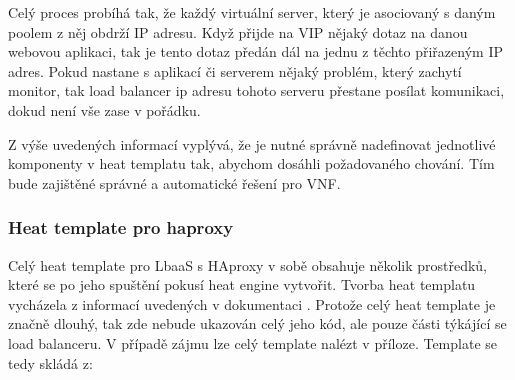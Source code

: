 Celý proces probíhá tak, že každý virtuální server, který je asociovaný s daným poolem z něj obdrží IP adresu. Když přijde na VIP nějaký dotaz na danou webovou aplikaci, tak je tento dotaz předán dál na jednu z těchto přiřazeným IP adres. Pokud nastane s aplikací či serverem nějaký problém, který zachytí monitor, tak load balancer ip adresu tohoto serveru přestane posílat komunikaci, dokud není vše zase v pořádku. 

Z výše uvedených informací vyplývá, že je nutné správně nadefinovat jednotlivé komponenty v heat templatu tak, abychom dosáhli požadovaného chování. Tím bude zajištěné správné a automatické řešení pro VNF.

\subsubsection{Heat template pro haproxy}

Celý heat template pro LbaaS s HAproxy v sobě obsahuje několik prostředků, které se po jeho spuštění pokusí heat engine vytvořit. Tvorba heat templatu vycházela z informací uvedených v dokumentaci \cite{HEAT}. Protože celý heat template je značně dlouhý, tak zde nebude ukazován celý jeho kód, ale pouze části týkájící se load balanceru. V případě zájmu lze celý template nalézt v příloze. Template se tedy skládá z:

